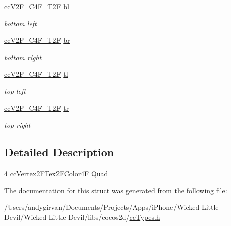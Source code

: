 \begin{DoxyCompactItemize}
\item 
\hypertarget{struct__cc_v2_f___c4_f___t2_f___quad_ab3d7d56d8a4f8559cc112df3efc65ee5}{\hyperlink{cc_types_8h_aa6b60cb391810a8343bfac1feb25cb08}{cc\-V2\-F\-\_\-\-C4\-F\-\_\-\-T2\-F} \hyperlink{struct__cc_v2_f___c4_f___t2_f___quad_ab3d7d56d8a4f8559cc112df3efc65ee5}{bl}}\label{struct__cc_v2_f___c4_f___t2_f___quad_ab3d7d56d8a4f8559cc112df3efc65ee5}

\begin{DoxyCompactList}\small\item\em bottom left \end{DoxyCompactList}\item 
\hypertarget{struct__cc_v2_f___c4_f___t2_f___quad_ad16061b4a7d358eaad4dd6886423536c}{\hyperlink{cc_types_8h_aa6b60cb391810a8343bfac1feb25cb08}{cc\-V2\-F\-\_\-\-C4\-F\-\_\-\-T2\-F} \hyperlink{struct__cc_v2_f___c4_f___t2_f___quad_ad16061b4a7d358eaad4dd6886423536c}{br}}\label{struct__cc_v2_f___c4_f___t2_f___quad_ad16061b4a7d358eaad4dd6886423536c}

\begin{DoxyCompactList}\small\item\em bottom right \end{DoxyCompactList}\item 
\hypertarget{struct__cc_v2_f___c4_f___t2_f___quad_a9a7508bd3aa33313ffcaf758d54340ce}{\hyperlink{cc_types_8h_aa6b60cb391810a8343bfac1feb25cb08}{cc\-V2\-F\-\_\-\-C4\-F\-\_\-\-T2\-F} \hyperlink{struct__cc_v2_f___c4_f___t2_f___quad_a9a7508bd3aa33313ffcaf758d54340ce}{tl}}\label{struct__cc_v2_f___c4_f___t2_f___quad_a9a7508bd3aa33313ffcaf758d54340ce}

\begin{DoxyCompactList}\small\item\em top left \end{DoxyCompactList}\item 
\hypertarget{struct__cc_v2_f___c4_f___t2_f___quad_a958bad4264fd526b87be7d8ca6833f7c}{\hyperlink{cc_types_8h_aa6b60cb391810a8343bfac1feb25cb08}{cc\-V2\-F\-\_\-\-C4\-F\-\_\-\-T2\-F} \hyperlink{struct__cc_v2_f___c4_f___t2_f___quad_a958bad4264fd526b87be7d8ca6833f7c}{tr}}\label{struct__cc_v2_f___c4_f___t2_f___quad_a958bad4264fd526b87be7d8ca6833f7c}

\begin{DoxyCompactList}\small\item\em top right \end{DoxyCompactList}\end{DoxyCompactItemize}


\subsection{Detailed Description}
4 cc\-Vertex2\-F\-Tex2\-F\-Color4\-F Quad 

The documentation for this struct was generated from the following file\-:\begin{DoxyCompactItemize}
\item 
/\-Users/andygirvan/\-Documents/\-Projects/\-Apps/i\-Phone/\-Wicked Little Devil/\-Wicked Little Devil/libs/cocos2d/\hyperlink{cc_types_8h}{cc\-Types.\-h}\end{DoxyCompactItemize}
